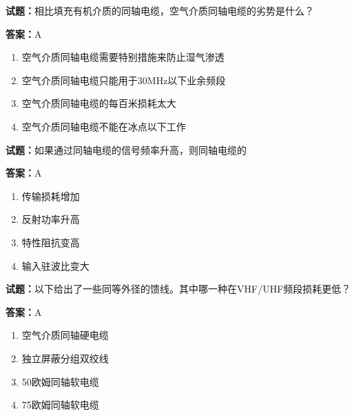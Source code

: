 \documentclass{ctexbook}
\begin{document}




\vspace{1em}

\textbf{试题：}相比填充有机介质的同轴电缆，空气介质同轴电缆的劣势是什么？ 

\textbf{答案：}A 

\begin{enumerate}[leftmargin=3em]
  \item 空气介质同轴电缆需要特别措施来防止湿气渗透 

  \item 空气介质同轴电缆只能用于30MHz以下业余频段 

  \item 空气介质同轴电缆的每百米损耗太大 

  \item 空气介质同轴电缆不能在冰点以下工作 

\end{enumerate}





\vspace{1em}

\textbf{试题：}如果通过同轴电缆的信号频率升高，则同轴电缆的 

\textbf{答案：}A 

\begin{enumerate}[leftmargin=3em]
  \item 传输损耗增加 

  \item 反射功率升高 


  \item 特性阻抗变高 

  \item 输入驻波比变大 

\end{enumerate}





\vspace{1em}

\textbf{试题：}以下给出了一些同等外径的馈线。其中哪一种在VHF/UHF频段损耗更低？ 

\textbf{答案：}A 

\begin{enumerate}[leftmargin=3em]
  \item 空气介质同轴硬电缆 

  \item 独立屏蔽分组双绞线 

  \item 50欧姆同轴软电缆 

  \item 75欧姆同轴软电缆 

\end{enumerate}
\end{document}
